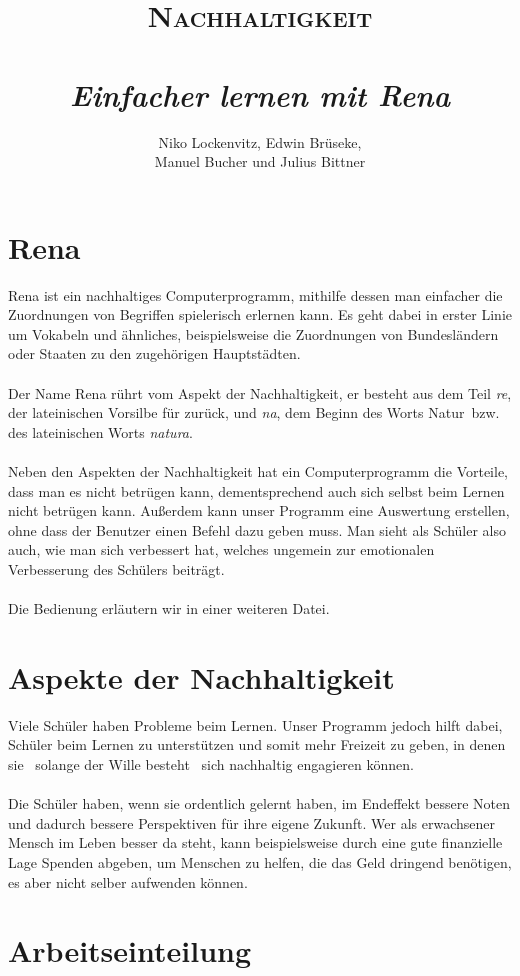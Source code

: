 \documentclass[a4paper, 11pt, titlepage]{article}
\author{Niko Lockenvitz, Edwin Brüseke,\\Manuel Bucher und Julius Bittner}
\title{\textsc{Nachhaltigkeit}\\\ \\\textsl{Einfacher lernen mit Rena}}
\begin{document}
\maketitle
\tableofcontents
\section{Rena}
Rena ist ein nachhaltiges Computerprogramm, mithilfe dessen man einfacher die Zuordnungen von Begriffen spielerisch erlernen kann. Es geht dabei in erster Linie um Vokabeln und ähnliches, beispielsweise die Zuordnungen von Bundesländern oder Staaten zu den zugehörigen Hauptstädten.\\\\
Der Name Rena rührt vom Aspekt der Nachhaltigkeit, er besteht aus dem Teil \textit{re}, der lateinischen Vorsilbe für \glqq zurück\grqq , und \textit{na}, dem Beginn des Worts \glqq Natur\grqq\ bzw. des lateinischen Worts \textit{natura}.\\\\
Neben den Aspekten der Nachhaltigkeit hat ein Computerprogramm die Vorteile, dass man es nicht betrügen kann, dementsprechend auch sich selbst beim Lernen nicht betrügen kann. Außerdem kann unser Programm eine Auswertung erstellen, ohne dass der Benutzer einen Befehl dazu geben muss. Man sieht als Schüler also auch, wie man sich verbessert hat, welches ungemein zur emotionalen Verbesserung des Schülers beiträgt.\\\\
Die Bedienung erläutern wir in einer weiteren Datei.

\section{Aspekte der Nachhaltigkeit}
Viele Schüler haben Probleme beim Lernen. Unser Programm jedoch hilft dabei, Schüler beim Lernen zu unterstützen und somit mehr Freizeit zu geben, in denen sie \textendash\ solange der Wille besteht \textendash\ sich nachhaltig engagieren können.\\\\
Die Schüler haben, wenn sie ordentlich gelernt haben, im Endeffekt bessere Noten und dadurch bessere Perspektiven für ihre eigene Zukunft. Wer als erwachsener Mensch im Leben besser da steht, kann beispielsweise durch eine gute finanzielle Lage Spenden abgeben, um Menschen zu helfen, die das Geld dringend benötigen, es aber nicht selber aufwenden können.

\section{Arbeitseinteilung}
\end{document}
